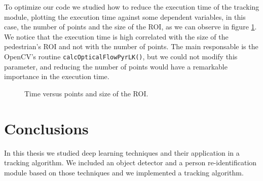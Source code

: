 \documentclass[12pt, a4paper, titlepage,twoside,openright]{article}
\begin{document}
To optimize our code we studied how to reduce the execution time of the tracking module, plotting the execution time against some dependent variables, in this case, the number of points and the size of the ROI, as we can observe in figure \ref{timing2}. We notice that the execution time is high correlated with the size of the pedestrian's ROI and not with the number of points. The main responsable is the OpenCV's routine \texttt{calcOpticalFlowPyrLK()}, but we could not modify this parameter, and reducing the number of points would have a remarkable importance in the execution time. 



\begin{figure}[H]
		
\centering

\caption{Time versus points and size of the ROI.}
\label{timing2}
\end{figure}








\section{Conclusions}


In this thesis we studied deep learning techniques and their application in a tracking algorithm. We included an object detector and a person re-identification module based on those techniques and we implemented a tracking algorithm.
\end{document}
